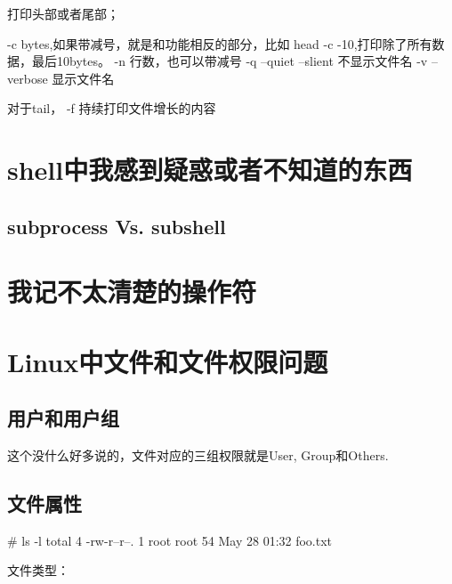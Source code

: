 打印头部或者尾部；

-c bytes,如果带减号，就是和功能相反的部分，比如 head -c -10,打印除了所有数据，最后10bytes。
-n 行数，也可以带减号
-q --quiet --slient 不显示文件名
-v --verbose 显示文件名


对于tail， -f 持续打印文件增长的内容


\section{shell中我感到疑惑或者不知道的东西}


\subsection{subprocess Vs. subshell}


\section{我记不太清楚的操作符}

\section{Linux中文件和文件权限问题}

\subsection{用户和用户组}

这个没什么好多说的，文件对应的三组权限就是User, Group和Others.

\subsection{文件属性}

\begin{Bash}
# ls -l
total 4
-rw-r--r--. 1 root root 54 May 28 01:32 foo.txt
\end{Bash}

文件类型：

